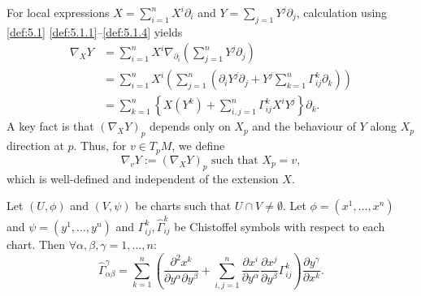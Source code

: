For local expressions $X = \sum_{i=1}^nX^i\partial_i$ and $Y = \sum_{j=1}Y^j\partial_j$, calculation using \autoref{def:5.1} \autoref{def:5.1.1}--\autoref{def:5.1.4} yields
\[
\begin{aligned}
\nabla_XY &= \sum_{i=1}^nX^i\nabla_{\partial_i}\left(\sum_{j=1}^nY^j\partial_j\right) \\
&= \sum_{i=1}^nX^i\left(\sum_{j=1}^n(\partial_iY^j \partial_j + Y^j\sum_{k=1}^n\Gamma_{ij}^k\partial_k)\right) \\
&= \sum_{k=1}^n \left\{X(Y^k) + \sum_{i,j=1}^n \Gamma_{ij}^kX^iY^j\right\}\partial_k.
\end{aligned}
\]
A key fact is that $(\nabla_XY)_p$ depends only on $X_p$ and the behaviour of $Y$ along $X_p$ direction at $p$.
Thus, for $v \in T_pM$, we define
\[
\nabla_vY := (\nabla_XY)_p \text{ such that } X_p = v,
\]
which is well-defined and independent of the extension $X$.

\begin{lemma}\label{lemma:christoffel_symbol_transformation}
Let $(U,\phi)$ and $(V, \psi)$ be charts such that $U \cap V \neq \emptyset$.
Let $\phi = (x^1, \dots, x^n)$ and $\psi = (y^1, \dots, y^n)$ and $\Gamma_{ij}^k, \hat{\Gamma}_{ij}^k$
be Chistoffel symbols with respect to each chart. Then $\forall \alpha, \beta, \gamma = 1, \dots, n$:
\[
\hat{\Gamma}_{\alpha\beta}^{\gamma} = \sum_{k=1}^n \left( \frac{\partial^2x^k}{\partial y^{\alpha}\partial y^{\beta}} + \sum_{i,j=1}^n \frac{\partial x^i}{\partial y^{\alpha}}\frac{\partial x^j}{\partial y^{\beta}}\Gamma_{ij}^k \right)\frac{\partial y^{\gamma}}{\partial x^k}.
\]
\end{lemma}

